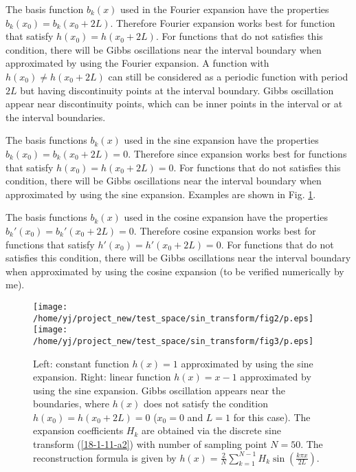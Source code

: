 \documentclass{article}
\begin{document}
The basis function $b_k (x)$ used in the Fourier expansion have the
properties $b_k (x_0) = b_k (x_0 + 2 L)$. Therefore Fourier expansion works
best for function that satisfy $h (x_0) = h (x_0 + 2 L)$. For functions that
do not satisfies this condition, there will be Gibbs oscillations near the
interval boundary when approximated by using the Fourier expansion. A function
with $h (x_0) \neq h (x_0 + 2 L)$ can still be considered as a periodic
function with period $2 L$ but having discontinuity points at the interval
boundary. Gibbs oscillation appear near discontinuity points, which can be
inner points in the interval or at the interval boundaries.

The basis functions $b_k (x)$ used in the sine expansion have the properties
$b_k (x_0) = b_k (x_0 + 2 L) = 0$. Therefore since expansion works best for
functions that satisfy $h (x_0) = h (x_0 + 2 L) = 0$. For functions that do
not satisfies this condition, there will be Gibbs oscillations near the
interval boundary when approximated by using the sine expansion. Examples are
shown in Fig. \ref{18-1-11-a1}.

The basis functions $b_k (x)$ used in the cosine expansion have the properties
$b_k' (x_0) = b_k' (x_0 + 2 L) = 0$. Therefore cosine expansion works best for
functions that satisfy $h' (x_0) = h' (x_0 + 2 L) = 0$. For functions that do
not satisfies this condition, there will be Gibbs oscillations near the
interval boundary when approximated by using the cosine expansion (to be
verified numerically by me).

\begin{figure}[h]
  \texttt{[image: /home/yj/project\_new/test\_space/sin\_transform/fig2/p.eps]}\texttt{[image: /home/yj/project\_new/test\_space/sin\_transform/fig3/p.eps]}
  \caption{\label{18-1-11-a1}Left: constant function $h (x) = 1$ approximated
  by using the sine expansion. Right: linear function $h (x) = x - 1$
  approximated by using the sine expansion. Gibbs oscillation appears near the
  boundaries, where $h (x)$ does not satisfy the condition $h (x_0) = h (x_0 +
  2 L) = 0$ ($x_0 = 0$ and $L = 1$ for this case). The expansion coefficients
  $H_k$ are obtained via the discrete sine transform (\ref{18-1-11-a2}) with
  number of sampling point $N = 50$. The reconstruction formula is given by $h
  (x) = \frac{2}{N} \sum_{k = 1}^{N - 1} H_k \sin \left( \frac{k \pi x}{2 L}
  \right)$.}
\end{figure}

\

\
\end{document}
